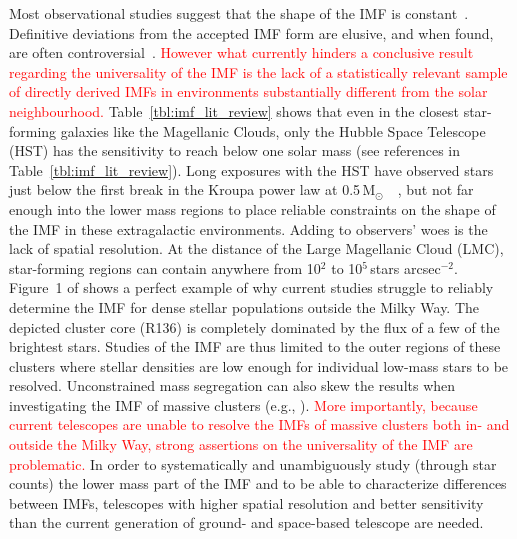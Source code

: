 \documentclass[referee]{aa}
\newcommand{\msun}{M$_\odot$~}
\newcommand{\h}[1]{$^{#1}$}
\newcommand{\spae}{stars arcsec$^{-2}$}
\newcommand{\langedit}[1]{\textcolor{red}{#1}}
\begin{document}
Most observational studies suggest that the shape of the IMF is constant~\citep{Lada2003-ip,Kroupa2002,Bastian2010}.
Definitive deviations from the accepted IMF form are elusive, and when found, are often controversial~\citep{Van_Dokkum2010-gx,Conroy2012-hv,Drass2016-kp}.
\langedit{However what currently hinders a conclusive result regarding the universality of the IMF is the lack of a statistically relevant sample of directly derived IMFs in environments substantially different from the solar neighbourhood.}
Table~\ref{tbl:imf_lit_review} shows that even in the closest star-forming galaxies like the Magellanic Clouds, only the Hubble Space Telescope (HST) has the sensitivity to reach below one solar mass (see references in Table~\ref{tbl:imf_lit_review}).
Long exposures with the HST have observed stars just below the first break in the Kroupa power law at 0.5\,\msun~\citep{dario2009,kalirai2013,geha2013}, but not far enough into the lower mass regions to place reliable constraints on the shape of the IMF in these extragalactic environments.
Adding to observers' woes is the lack of spatial resolution.
At the distance of the Large Magellanic Cloud (LMC), star-forming regions can contain anywhere from 10\h2 to 10\h5\,\spae.
Figure~1 of \citet{sirianni2000} shows a perfect example of why current studies struggle to reliably determine the IMF for dense stellar populations outside the Milky Way.
The depicted cluster core (R136) is completely dominated by the flux of a few of the brightest stars.
Studies of the IMF are thus limited to the outer regions of these clusters where stellar densities are low enough for individual low-mass stars to be resolved.
Unconstrained mass segregation can also skew the results when investigating the IMF of massive clusters (e.g., \citealt{Ascenso2009-de}).
\langedit{More importantly, because current telescopes are unable to resolve the IMFs of massive clusters both in- and outside the Milky Way, strong assertions on the universality of the IMF are problematic.}
In order to systematically and unambiguously study (through star counts) the lower mass part of the IMF and to be able to characterize differences between IMFs, telescopes with higher spatial resolution and better sensitivity than the current generation of ground- and space-based telescope are needed.
\end{document}
